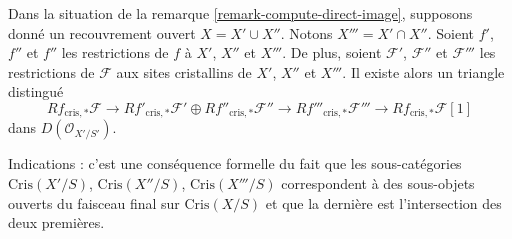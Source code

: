 \begin{remark}
\label{remark-mayer-vietoris}
Dans la situation de la remarque \ref{remark-compute-direct-image},
supposons donné un recouvrement ouvert $X = X' \cup X''$. Notons
$X''' = X' \cap X''$. Soient $f'$, $f''$ et $f''$ les restrictions de $f$
à $X'$, $X''$ et $X'''$. De plus, soient $\mathcal{F}'$, $\mathcal{F}''$
et $\mathcal{F}'''$ les restrictions de $\mathcal{F}$ aux sites cristallins
de $X'$, $X''$ et $X'''$. Il existe alors un triangle distingué
$$
Rf_{\text{cris}, *}\mathcal{F}
\longrightarrow
Rf'_{\text{cris}, *}\mathcal{F}' \oplus Rf''_{\text{cris}, *}\mathcal{F}''
\longrightarrow
Rf'''_{\text{cris}, *}\mathcal{F}'''
\longrightarrow
Rf_{\text{cris}, *}\mathcal{F}[1]
$$
dans $D(\mathcal{O}_{X'/S'})$.

\medskip\noindent
Indications : c'est une conséquence formelle du fait que les sous-catégories
$\text{Cris}(X'/S)$, $\text{Cris}(X''/S)$, $\text{Cris}(X'''/S)$ correspondent
à des sous-objets ouverts du faisceau final sur $\text{Cris}(X/S)$ et que la
dernière est l'intersection des deux premières.
\end{remark}

